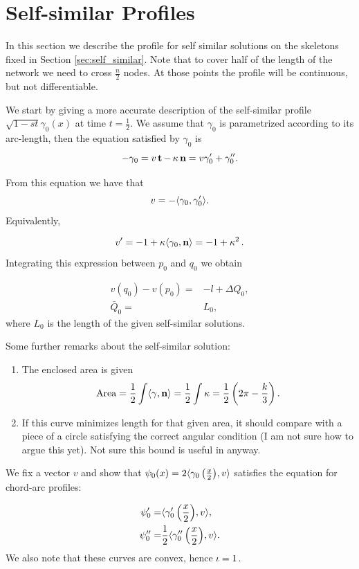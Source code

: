 \documentclass[11pt]{amsart}
\begin{document}
\section{Self-similar Profiles}

In this section we describe the profile for self similar solutions on the skeletons fixed in Section \ref{sec:self_similar}. Note that to cover half of the length of the network we need to cross $\frac{n}{2}$ nodes. At those points the profile will be continuous, but not differentiable.

We start by giving a more accurate description of the self-similar profile $\sqrt{1-st}\gamma_0(x)$ at time $t=\frac{1}{2}$. We assume that $\gamma_0$ is parametrized according to its arc-length, then the equation satisfied by $\gamma_0$ is
\begin{equation} -\gamma_0= v \operatorname{\mathbf{t}}- \operatorname{\kappa} \operatorname{\mathbf{n}}= v \gamma_0'+\gamma_0''.
\label{eq:self-similar curve}
\end{equation}

From this equation we have that
$$v=- \langle{\gamma_0},{\gamma_0'}\rangle.$$
Equivalently,

$$v'=-1+\operatorname{\kappa}\langle{\gamma_0},{\operatorname{\mathbf{n}}}\rangle =-1+\operatorname{\kappa}^2.$$
Integrating this expression between $p_0$ and $q_0$ we obtain

\begin{align*}
v(q_0)-v(p_0)=& - l+\Delta Q_0,\\
\bar{Q}_0=&L_0,
\end{align*}
where $L_0$ is the length of the given self-similar solutions.

Some further remarks about the self-similar solution:

\begin{enumerate}
\item The enclosed area is given
$$\operatorname{Area}=\frac{1}{2}\int \langle{\gamma},{\operatorname{\mathbf{n}}}\rangle=\frac{1}{2}\int \operatorname{\kappa}=\frac{1}{2}\left(2\pi-\frac{k}{3}\right).$$
\item If this curve minimizes length for that given area, it should compare with a piece of a circle satisfying the correct angular condition (I am not sure how to argue this yet). Not sure this bound is useful in anyway.
\end{enumerate}


We fix a vector $v$ and show that $\psi_0(x)=2\langle{\gamma_0\left(\frac{x}{2}\right)},{v}\rangle$ satisfies the equation for chord-arc profiles:

\begin{align*}
\psi_0'= &\langle{\gamma_0'\left(\frac{x}{2}\right)},{v}\rangle,\\
\psi_0''= &\frac{1}{2}\langle{\gamma_0''\left(\frac{x}{2}\right)},{v}\rangle.
\end{align*}
We also note that these curves are convex, hence $\operatorname{\iota}=1$.
\end{document}
